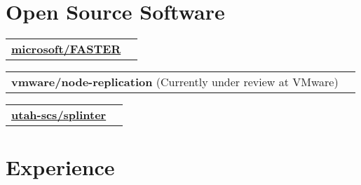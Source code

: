 \documentclass[margin,line]{res}
\begin{document}
\begin{resume}


\section{\sc Open Source Software}
\begin{tabular}{@{}p{5.5in}p{4in}}
\href{{https://github.com/microsoft/FASTER}}{{\bf microsoft/FASTER}}\\
\end{tabular}

\vspace{-2.5pt}
\begin{tabular}{@{}p{5.5in}p{4in}}
{\bf vmware/node-replication} ({\small Currently under review at VMware})\\
\end{tabular}

\vspace{-2.5pt}
\begin{tabular}{@{}p{5.5in}p{4in}}
\href{{https://github.com/utah-scs/splinter}}
{{\bf utah-scs/splinter}}\\
\end{tabular}

\section{\sc Experience}


\end{resume}
\end{document}
